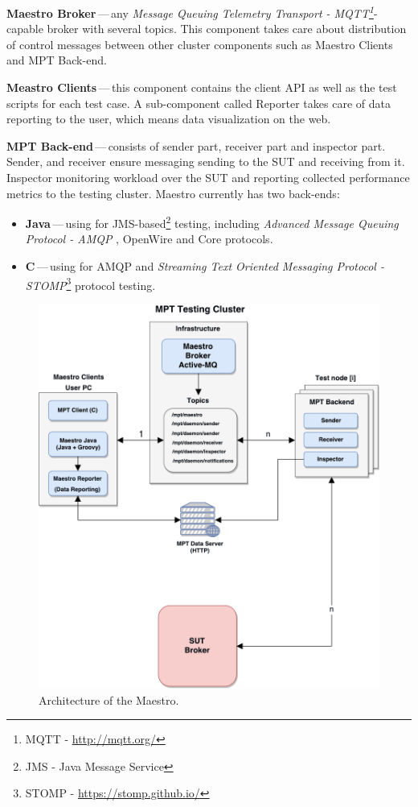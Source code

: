 \begin{description}
	\setlength\itemsep{0em}
	\item \textbf{Maestro Broker}\,---\,any \emph{Message Queuing Telemetry Transport - MQTT\footnote{MQTT - \url{http://mqtt.org/}}}-capable broker with several topics. This component takes care about distribution of control messages between other cluster components such as Maestro Clients and MPT Back-end. 
	\item \textbf{Meastro Clients}\,---\,this component contains the client API as well as the test scripts for each test case. A sub-component called Reporter takes care of data reporting to the user, which means data visualization on the web.
	\item \textbf{MPT Back-end}\,---\,consists of sender part, receiver part and inspector part. Sender, and receiver ensure messaging sending to the SUT and receiving from it. Inspector monitoring workload over the SUT and reporting collected performance metrics to the testing cluster. Maestro currently has two back-ends:
	\begin{itemize}
		\item \textbf{Java}\,---\,using for JMS-based\footnote{JMS - Java Message Service} testing, including \emph{Advanced Message Queuing Protocol - AMQP} \cite{OASIS:AMQP}, OpenWire and Core protocols.
		\item \textbf{C}\,---\,using for AMQP and \emph{Streaming Text Oriented Messaging Protocol - STOMP}\footnote{STOMP - \url{https://stomp.github.io/}} protocol testing.
	\end{itemize}
\end{description}

\begin{figure}[H]
  \centering
  \includegraphics[width=15cm]{obrazky-figures/msg_perf_tool.pdf}
  \caption{Architecture of the Maestro.}
  \label{fig:msg_perf_tool}
\end{figure}


